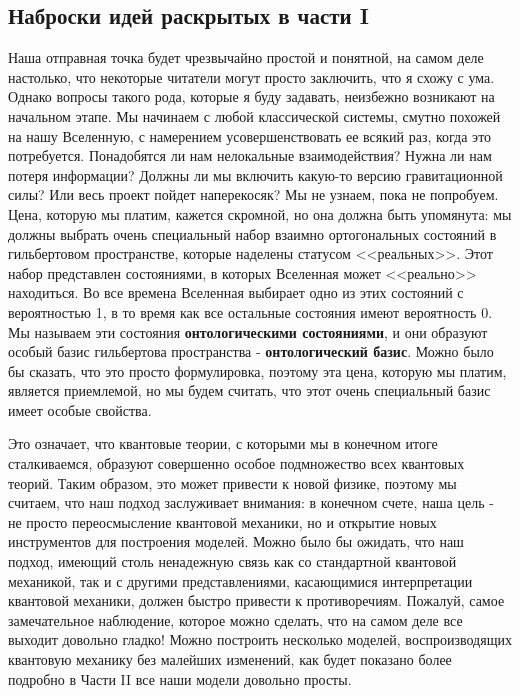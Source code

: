 \documentclass[main.tex]{subfiles}
\begin{document}
\subsection{Наброски идей раскрытых в части I}\label{ch1.2}

Наша отправная точка будет чрезвычайно простой и понятной, на самом деле настолько, что некоторые читатели могут просто заключить, что я схожу с ума. Однако вопросы такого рода, которые я буду задавать, неизбежно возникают на начальном этапе. Мы начинаем с любой классической системы, смутно похожей на нашу Вселенную, с намерением усовершенствовать ее всякий раз, когда это потребуется. Понадобятся ли нам нелокальные взаимодействия? Нужна ли нам потеря информации? Должны ли мы включить какую-то версию гравитационной силы? Или весь проект пойдет наперекосяк? Мы не узнаем, пока не попробуем. Цена, которую мы платим, кажется скромной, но она должна быть упомянута: мы должны выбрать очень специальный набор взаимно ортогональных состояний в гильбертовом пространстве, которые наделены статусом <<реальных>>. Этот набор представлен состояниями, в которых Вселенная может <<реально>> находиться. Во все времена Вселенная выбирает одно из этих состояний с вероятностью 1, в то время как все остальные состояния имеют вероятность 0. Мы называем эти состояния \textbf{онтологическими состояниями}, и они образуют особый базис гильбертова пространства - \textbf{онтологический базис}. Можно было бы сказать, что это просто формулировка, поэтому эта цена, которую мы платим, является приемлемой, но мы будем считать, что этот очень специальный базис имеет особые свойства.

Это означает, что квантовые теории, с которыми мы в конечном итоге сталкиваемся, образуют совершенно особое подмножество всех квантовых теорий. Таким образом, это может привести к новой физике, поэтому мы считаем, что наш подход заслуживает внимания: в конечном счете, наша цель - не просто переосмысление квантовой механики, но и открытие новых инструментов для построения моделей. Можно было бы ожидать, что наш подход, имеющий столь ненадежную связь как со стандартной квантовой механикой, так и с другими представлениями, касающимися интерпретации квантовой механики, должен быстро привести к противоречиям. Пожалуй, самое замечательное наблюдение, которое можно сделать, что на самом деле все выходит довольно гладко! Можно построить несколько моделей, воспроизводящих квантовую механику без малейших изменений, как будет показано более подробно в Части II все наши модели довольно просты. 
\end{document}
